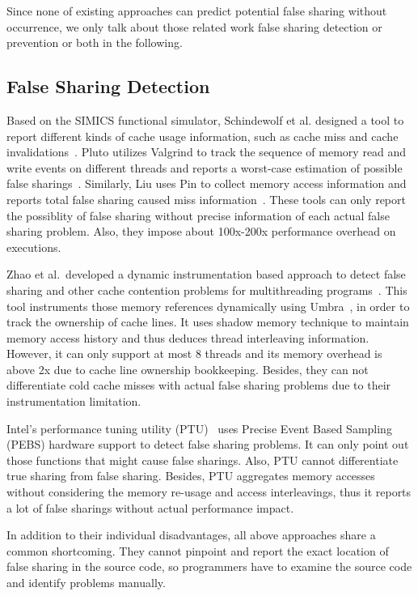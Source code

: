 \label{sec:relatedwork}

Since none of existing approaches can predict potential false sharing without occurrence, 
we only talk about those related work false sharing detection or prevention or both in the following.

\subsection{False Sharing Detection}
Based on the SIMICS functional simulator, Schindewolf et al. designed a tool 
to report different kinds of cache usage information,
such as cache miss and cache invalidations~\cite{falseshare:simulator}.
Pluto utilizes Valgrind to track the sequence of memory read and write
events on different threads and reports a worst-case estimation of
possible false sharings~\cite{falseshare:binaryinstrumentation1}.
Similarly, Liu uses Pin to collect memory access information and
reports total false sharing caused miss information~\cite{falseshare:binaryinstrumentation2}.
These tools can only report the possiblity of false sharing without precise information of each
actual false sharing problem.  
Also, they impose about 100x-200x performance overhead on executions.  

Zhao et al.\ developed a dynamic instrumentation based approach to 
detect false sharing and other cache contention problems
for multithreading programs~\cite{qinzhaodetection}. 
This tool instruments those memory references dynamically using Umbra~\cite{Umbra}, 
in order to track the ownership of cache lines. It uses shadow memory technique to 
maintain memory access history and thus deduces thread interleaving information.
However, it can only support at most $8$ threads and its memory overhead 
is above 2x due to cache line ownership bookkeeping. Besides, they can not differentiate
cold cache misses with actual false sharing problems due to their instrumentation limitation. 

Intel's performance tuning utility (PTU)~\cite{detect:ptu, detect:intel} uses Precise
Event Based Sampling (PEBS) hardware support to detect false sharing problems. 
It can only point out those functions that might cause false sharings.
Also, PTU cannot differentiate true sharing from
false sharing. Besides, PTU aggregates memory accesses without considering the memory re-usage and
access interleavings, thus it reports a lot of
false sharings without actual performance impact.

In addition to their individual disadvantages,
all above approaches share a common shortcoming. 
They cannot pinpoint and report the exact location of false sharing in the source code, 
so programmers have to examine the source code and identify problems manually.

